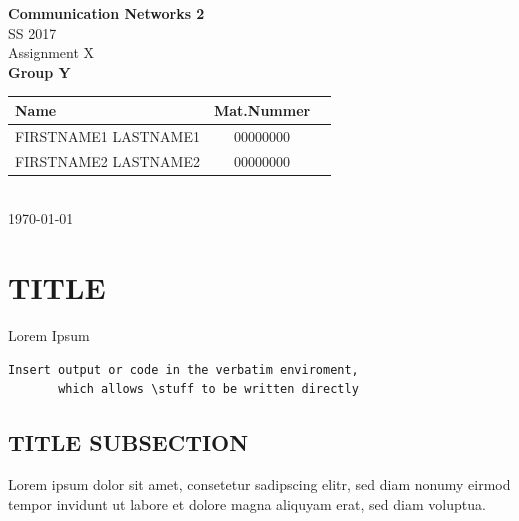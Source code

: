 \documentclass[parskip=full]{scrartcl}
\begin{document}
\begin{titlepage}
    \centering
    \vspace*{2cm}
    {\Huge \textbf{Communication Networks 2}}\\
    SS 2017\\
    \vspace*{1cm}
    {\Large Assignment X}
    \\\vspace*{3cm}
    {\Large \textbf{Group Y}}\\
    \vspace*{1cm}
    {\large 
        \begin{tabular}{l c c}
            Name & Mat.Nummer \\ \hline
            FIRSTNAME1 LASTNAME1 & 00000000 \\
            FIRSTNAME2 LASTNAME2 & 00000000
        \end{tabular}
    }
    \\\vspace*{7cm}
    \today
\end{titlepage}

\section{TITLE}

Lorem Ipsum

\begin{verbatim}
Insert output or code in the verbatim enviroment,
       which allows \stuff to be written directly
\end{verbatim}

\subsection{TITLE SUBSECTION}
Lorem ipsum dolor sit amet, consetetur sadipscing elitr, sed diam nonumy eirmod tempor invidunt ut labore et dolore magna aliquyam erat, sed diam voluptua.

\end{document}
